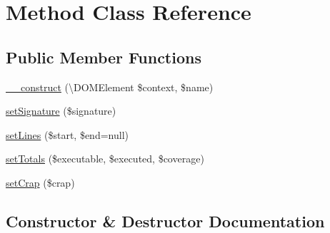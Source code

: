 \hypertarget{class_sebastian_bergmann_1_1_code_coverage_1_1_report_1_1_xml_1_1_method}{}\section{Method Class Reference}
\label{class_sebastian_bergmann_1_1_code_coverage_1_1_report_1_1_xml_1_1_method}
\subsection*{Public Member Functions}
\begin{DoxyCompactItemize}
\item 
\mbox{\hyperlink{class_sebastian_bergmann_1_1_code_coverage_1_1_report_1_1_xml_1_1_method_ae8cac6187a6beca2a7d965670cf62134}{\+\_\+\+\_\+construct}} (\textbackslash{}D\+O\+M\+Element \$context, \$name)
\item 
\mbox{\hyperlink{class_sebastian_bergmann_1_1_code_coverage_1_1_report_1_1_xml_1_1_method_a3560ff574f83c47c1f95f191463b4dcf}{set\+Signature}} (\$signature)
\item 
\mbox{\hyperlink{class_sebastian_bergmann_1_1_code_coverage_1_1_report_1_1_xml_1_1_method_ab05010e6d0206acfd6e5b4c0ca0bbd97}{set\+Lines}} (\$start, \$end=null)
\item 
\mbox{\hyperlink{class_sebastian_bergmann_1_1_code_coverage_1_1_report_1_1_xml_1_1_method_a7b9f6c3f548f275b21e3ce9f269f3c07}{set\+Totals}} (\$executable, \$executed, \$coverage)
\item 
\mbox{\hyperlink{class_sebastian_bergmann_1_1_code_coverage_1_1_report_1_1_xml_1_1_method_acb084a3e750794ebb3ba68cb71d61d79}{set\+Crap}} (\$crap)
\end{DoxyCompactItemize}


\subsection{Constructor \& Destructor Documentation}
\mbox{\label{class_sebastian_bergmann_1_1_code_coverage_1_1_report_1_1_xml_1_1_method_ae8cac6187a6beca2a7d965670cf62134}} 
